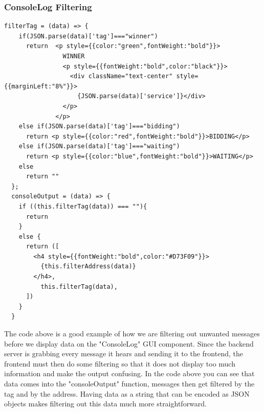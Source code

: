 \documentclass[draftclsnofoot, onecolumn, compsoc, 10pt]{IEEEtran}
\begin{document}
\subsubsection{ConsoleLog Filtering}
\begin{lstlisting}
filterTag = (data) => {
    if(JSON.parse(data)['tag']==="winner")
      return  <p style={{color:"green",fontWeight:"bold"}}>
                WINNER
                <p style={{fontWeight:"bold",color:"black"}}>
                  <div className="text-center" style={{marginLeft:"8%"}}>
                    {JSON.parse(data)['service']}</div>
                </p>
              </p>
    else if(JSON.parse(data)['tag']==="bidding")
      return <p style={{color:"red",fontWeight:"bold"}}>BIDDING</p>
    else if(JSON.parse(data)['tag']==="waiting")
      return <p style={{color:"blue",fontWeight:"bold"}}>WAITING</p>
    else
      return ""
  };
  consoleOutput = (data) => {
    if ((this.filterTag(data)) === ""){
      return
    }
    else {
      return ([
        <h4 style={{fontWeight:"bold",color:"#D73F09"}}>
          {this.filterAddress(data)}
        </h4>,
          this.filterTag(data),
      ])   
    }
  }
\end{lstlisting}
The code above is a good example of how we are filtering out unwanted messages before we display data on the "ConsoleLog" GUI component. Since the backend server is grabbing every message it hears and sending it to the frontend, the frontend must then do some filtering so that it does not display too much information and make the output confusing. In the code above you can see that data comes into the "consoleOutput" function, messages then get filtered by the tag and by the address. Having data as a string that can be encoded as JSON objects makes filtering out this data much more straightforward.

\newpage
\end{document}
